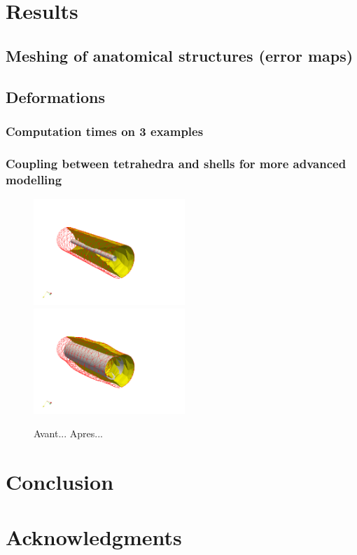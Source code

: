 \documentclass{llncs}
\begin{document}
\section{Results}
\label{sec:results}
\subsection{Meshing of anatomical structures (error maps)}



\subsection{Deformations}
\subsubsection{Computation times on 3 examples}
\subsubsection{Coupling between tetrahedra and shells for more advanced modelling}
\begin{figure}
\centering
\includegraphics[height=4cm]{images/stent_begin.png}
\includegraphics[height=4cm]{images/stent_end.png}
\caption {Avant... Apres...}
\label{fig-stent}
\end{figure}


\section{Conclusion}
\section*{Acknowledgments}



\end{document}
